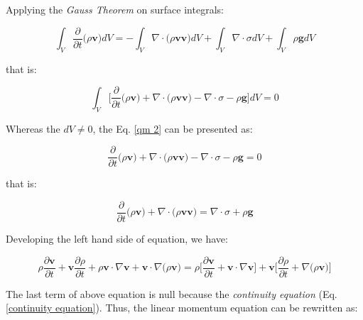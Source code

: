 \medskip
\noindent
Applying the \textit{Gauss Theorem} on surface integrals:

\begin{equation}
 \int_{V} \frac{\partial}{\partial t} \big( \rho \textbf{v} \big) dV
 = - 
 \int_{V} \nabla \cdot \big( \rho \textbf{v} \textbf{v} \big) dV
 +
 \int_{V} \nabla \cdot \sigma dV
 +
 \int_{V} \rho \textbf{g} dV
\end{equation}

\medskip
\noindent
that is:

\begin{equation} \label{qm 2}
 \int_{V} \Bigg[ \frac{\partial}{\partial t} \big( \rho \textbf{v} \big)
 + 
 \nabla \cdot \big( \rho \textbf{v} \textbf{v} \big)
 -
 \nabla \cdot \sigma
 -
 \rho \textbf{g} \Bigg] dV = 0
\end{equation}



\medskip
\noindent
Whereas the $dV \neq 0$,
the Eq. \ref{qm 2} can be presented as:



\begin{equation}
 \frac{\partial}{\partial t} \big( \rho \textbf{v} \big)
 + 
 \nabla \cdot \big( \rho \textbf{v} \textbf{v} \big)
 -
 \nabla \cdot \sigma
 -
 \rho \textbf{g} = 0
\end{equation}


\medskip
\noindent
that is:

\begin{equation}
 \frac{\partial}{\partial t} \big( \rho \textbf{v} \big) 
 +
 \nabla \cdot \big( \rho \textbf{v} \textbf{v} \big)
 =
 \nabla \cdot \sigma
 +
 \rho \textbf{g}
\end{equation}

\medskip
\noindent
Developing the left hand side of equation, we have:

\begin{equation}
 \rho \frac{\partial \textbf{v}}{\partial t}
 +
 \textbf{v} \frac{\partial \rho}{\partial t}
 +
 \rho \textbf{v} \cdot \nabla \textbf{v}
 + 
 \textbf{v} \cdot \nabla \big( \rho \textbf{v} \big)
 =
 \rho \Bigg[ \frac{\partial \textbf{v}}{\partial t} + \textbf{v} \cdot \nabla \textbf{v} \Bigg]
 +
 \textbf{v} \Bigg[ \frac{\partial \rho}{\partial t} + \nabla \big( \rho \textbf{v} \big) \Bigg]
\end{equation}

\newpage
The last term of above equation is null because
 the \textit{continuity equation} (Eq. \ref{continuity equation}).
Thus, the linear momentum equation can be rewritten as:

